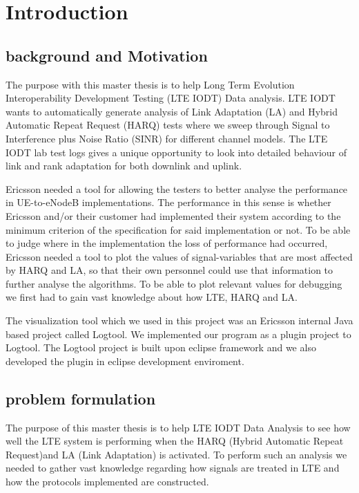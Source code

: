 \documentclass[cropmarks, frame, english]{idamasterthesis}
\author{Paul Nedstrand \& Razmus Lindgren}
\begin{document}

\makeintropages

\chapter{Introduction}

\section{background and Motivation}
The purpose with this master thesis is to help Long Term Evolution Interoperability Development Testing (LTE IODT) Data analysis. LTE IODT wants to automatically generate analysis of Link Adaptation (LA) and Hybrid Automatic Repeat Request (HARQ) tests where we sweep through Signal to Interference plus Noise Ratio (SINR) for different channel models. The LTE IODT lab test logs gives a unique opportunity to look into detailed behaviour of link and rank adaptation for both downlink and uplink. \newline


Ericsson needed a tool for allowing the testers to better analyse the performance in UE-to-eNodeB implementations. The performance in this sense is whether Ericsson and/or their customer had implemented their system according to the minimum criterion of the specification for said implementation or not. To be able to judge where in the implementation the loss of performance had occurred, Ericsson needed a tool to plot the values of signal-variables that are most affected by HARQ and LA, so that their own personnel could use that information to further analyse the algorithms. To be able to plot relevant values for debugging we first had to gain vast knowledge about how LTE, HARQ and LA. \newline


The visualization tool which we used in this project was an Ericsson internal Java based project called Logtool. We implemented our program as a plugin project to Logtool. The Logtool project is built upon eclipse framework and we also developed the plugin in eclipse development enviroment. 





\section{problem formulation}
The purpose of this master thesis is to help LTE IODT Data Analysis to see how well the LTE system is performing when the HARQ (Hybrid Automatic Repeat Request)and LA (Link Adaptation) is activated. To perform such an analysis we needed to gather vast knowledge regarding how signals are treated in LTE and how the protocols implemented are constructed.
\end{document}
